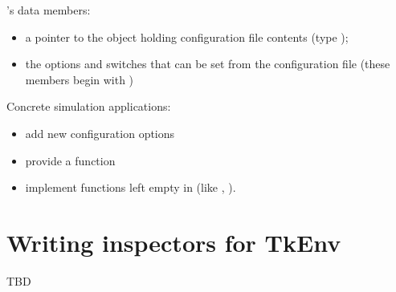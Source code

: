 's data members:
\begin{itemize}
  \item{a pointer to the object holding configuration file contents
    (type );}
  \item{the options and switches that can be set from the
    configuration file (these members begin with )}
\end{itemize}

Concrete simulation applications:
\begin{itemize}
  \item{add new configuration options}
  \item{provide a  function}
  \sloppy
  \item{implement functions left empty in  (like
    , ).}
\end{itemize}



\section{Writing inspectors for TkEnv}

TBD\\


